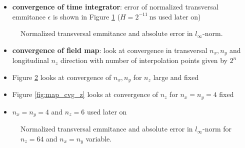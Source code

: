 \begin{itemize}
   \item \textbf{convergence of time integrator}: error of normalized transversal emmitance $\epsilon$ is shown in Figure \ref{fig:int_cvg} ($H=2^{-11}\ \mathrm{ns}$ used later on)\\
\end{itemize}

\begin{center}
\begin{figure}[H]
   \begin{subfigure}{0.4\textwidth}
      
   \end{subfigure}
   \qquad \qquad \qquad
   \begin{subfigure}{0.4\textwidth}
      
   \end{subfigure}
   \caption{Normalized transversal emmitance and absolute error in $l_\infty$-norm.}
   \label{fig:int_cvg}
\end{figure}
\end{center}

\begin{itemize}
   \item \textbf{convergence of field map}: look at convergence in transversal $n_x, n_y$ and longitudinal $n_z$ direction with number of interpolation points given by $2^n$
   \item Figure \ref{fig:map_cvg_xy} looks at convergence of $n_x, n_y$ for $n_z$ large and fixed
   \item Figure \ref{fig:map_cvg_z} looks at convergence of $n_z$ for $n_x=n_y=4$ fixed
   \item $n_x=n_y=4$ and $n_z=6$ used later on
\end{itemize}

\begin{center}
\begin{figure}[H]
   \begin{subfigure}{0.4\textwidth}
      
   \end{subfigure}
   \qquad \qquad \qquad
   \begin{subfigure}{0.4\textwidth}
      
   \end{subfigure}
   \caption{Normalized transversal emmitance and absolute error in $l_\infty$-norm for $n_z=64$ and $n_x=n_y$ variable.}
   \label{fig:map_cvg_xy}
\end{figure}
\end{center}

